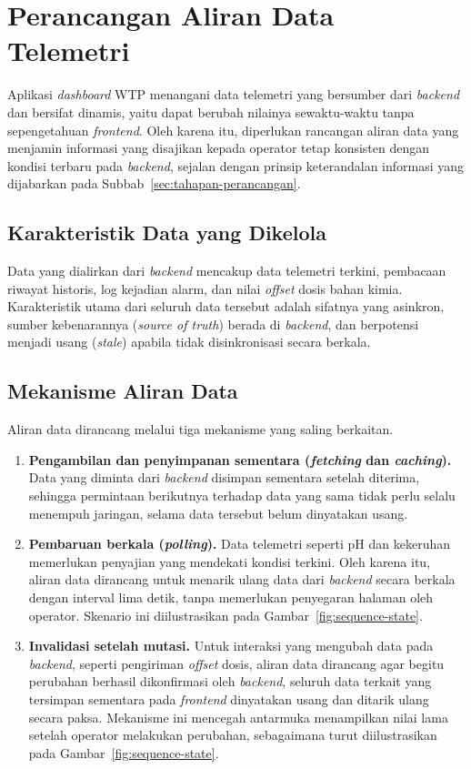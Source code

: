 \section{Perancangan Aliran Data Telemetri}
Aplikasi \textit{dashboard} WTP menangani data telemetri yang bersumber dari \textit{backend} dan bersifat 
dinamis, yaitu dapat berubah nilainya sewaktu-waktu tanpa sepengetahuan \textit{frontend}. Oleh karena itu, 
diperlukan rancangan aliran data yang menjamin informasi yang disajikan kepada operator tetap konsisten dengan 
kondisi terbaru pada \textit{backend}, sejalan dengan prinsip keterandalan informasi yang dijabarkan pada 
Subbab~\ref{sec:tahapan-perancangan}.

\subsection{Karakteristik Data yang Dikelola}
Data yang dialirkan dari \textit{backend} mencakup data telemetri terkini, pembacaan riwayat historis, log 
kejadian alarm, dan nilai \textit{offset} dosis bahan kimia. Karakteristik utama dari seluruh data tersebut 
adalah sifatnya yang asinkron, sumber kebenarannya (\textit{source of truth}) berada di \textit{backend}, dan 
berpotensi menjadi usang (\textit{stale}) apabila tidak disinkronisasi secara berkala.

\subsection{Mekanisme Aliran Data}
Aliran data dirancang melalui tiga mekanisme yang saling berkaitan.

\begin{enumerate}
    \item \textbf{Pengambilan dan penyimpanan sementara (\textit{fetching} dan \textit{caching}).} Data yang 
    diminta dari \textit{backend} disimpan sementara setelah diterima, sehingga permintaan berikutnya terhadap 
    data yang sama tidak perlu selalu menempuh jaringan, selama data tersebut belum dinyatakan usang.
    
    \item \textbf{Pembaruan berkala (\textit{polling}).} Data telemetri seperti pH dan kekeruhan memerlukan 
    penyajian yang mendekati kondisi terkini. Oleh karena itu, aliran data dirancang untuk menarik ulang data 
    dari \textit{backend} secara berkala dengan interval lima detik, tanpa memerlukan penyegaran halaman oleh 
    operator. Skenario ini diilustrasikan pada Gambar~\ref{fig:sequence-state}.
    
    \item \textbf{Invalidasi setelah mutasi.} Untuk interaksi yang mengubah data pada \textit{backend}, seperti 
    pengiriman \textit{offset} dosis, aliran data dirancang agar begitu perubahan berhasil dikonfirmasi oleh 
    \textit{backend}, seluruh data terkait yang tersimpan sementara pada \textit{frontend} dinyatakan usang dan 
    ditarik ulang secara paksa. Mekanisme ini mencegah antarmuka menampilkan nilai lama setelah operator 
    melakukan perubahan, sebagaimana turut diilustrasikan pada Gambar~\ref{fig:sequence-state}.
\end{enumerate}

